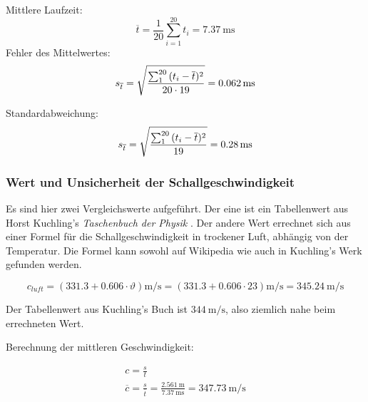 Mittlere Laufzeit:
\begin{equation}
    \overline{t} = \frac{1}{20} \sum_{i=1}^{20} t_i = \SI{7.37}{\milli\second}
\end{equation}
Fehler des Mittelwertes:
\begin{equation}
    s_{\overline{t}} = \sqrt{ \frac{\sum_{1}^{20}{(t_i-\overline{t})^2}}{20 \cdot 19}} = \SI{0.062}{\milli\second} \\
\end{equation}

Standardabweichung:
\begin{equation}
    s_{\overline{t}} = \sqrt{ \frac{\sum_{1}^{20}{(t_i-\overline{t})^2}}{19}} = \SI{0.28}{\milli\second} \\
\end{equation}


\subsubsection{Wert und Unsicherheit der Schallgeschwindigkeit}

Es   sind   hier  zwei   Vergleichswerte   aufgef\"uhrt. Der   eine  ist   ein
Tabellenwert    aus   Horst    Kuchling's   \emph{Taschenbuch    der   Physik}
\cite{ref:kuchling:speedOfSoundTable}.    Der  andere   Wert  errechnet   sich
aus   einer    Formel   f\"ur    die   Schallgeschwindigkeit    in   trockener
Luft,   abh\"angig   von  der   Temperatur.  Die   Formel   kann  sowohl   auf
Wikipedia  \cite{ref:wikipedia:speedOfSound}  wie   auch  in  Kuchling's  Werk
\cite{ref:kuchling:speedOfSoundFormula} gefunden werden.

\begin{equation}
    c_{luft} = (331.3 + 0.606 \cdot \vartheta) \si{\meter\per\second} = (331.3 + 0.606 \cdot 23) \si{\meter\per\second} = \SI{345.24}{\meter\per\second}
\end{equation}

Der Tabellenwert  aus Kuchling's Buch ist  $\SI{344}{\meter\per\second}$, also
ziemlich nahe beim errechneten Wert.


Berechnung der mittleren Geschwindigkeit:

\begin{gather}
    c = \frac{s}{t} \\
    \overline{c} = \frac{s}{\overline{t}} = \frac{\SI{2.561}{\meter}}{\SI{7.37}{\milli\second}} = \SI{347.73}{\meter\per\second} \\
\end{gather}

